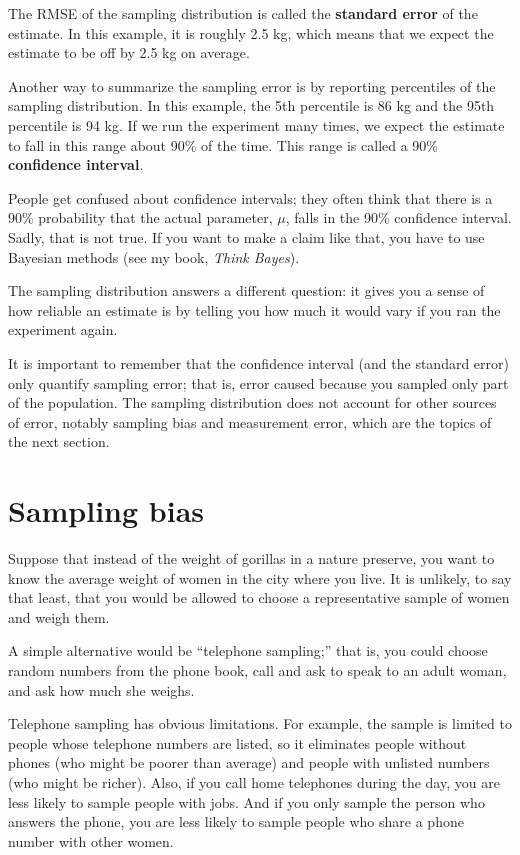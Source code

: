 \documentclass[12pt]{book}
\begin{document}
The RMSE of the sampling distribution is called the {\bf standard
  error} of the estimate.  In this example, it is roughly 2.5 kg,
which means that we expect the estimate to be off by 2.5 kg on
average.

Another way to summarize the sampling error is by reporting
percentiles of the sampling distribution.  In this example, the 5th
percentile is 86 kg and the 95th percentile is 94 kg.  If we run the
experiment many times, we expect the estimate to fall in this range
about 90\% of the time.  This range is called a 90\%
{\bf confidence interval}.

People get confused about confidence intervals; they often think
that there is a 90\% probability that the actual parameter, $\mu$,
falls in the 90\% confidence interval.  Sadly, that is not true.
If you want to make a claim like that, you have to use Bayesian
methods (see my book, {\it Think Bayes}).

The sampling distribution answers a different question:
it gives you a sense of how reliable an estimate
is by telling you how much it would vary if you ran the experiment
again.

It is important to remember that the confidence interval
(and the standard error) only quantify sampling error; that is,
error caused because you sampled only part of the population.
The sampling distribution does not account for other
sources of error, notably sampling bias and measurement error, 
which are the topics of the next section.


\section{Sampling bias}

Suppose that instead of the weight of gorillas in a nature preserve,
you want to know the average weight of women in the city where you
live.  It is unlikely, to say that least, that you would be allowed
to choose a representative sample of women and
weigh them.

A simple alternative would be
``telephone sampling;'' that is,
you could choose random numbers from the phone book, call and ask to
speak to an adult woman, and ask how much she weighs.

Telephone sampling has obvious limitations.  For example, the
sample is limited to people whose telephone numbers are listed, so
it eliminates people without phones (who might be poorer than average)
and people with unlisted numbers (who might be richer).
Also, if you
call home telephones during the day, you are less likely to sample
people with jobs.  And if you only sample the person who answers
the phone, you are less likely to sample people who share a phone
number with other women.
\end{document}
